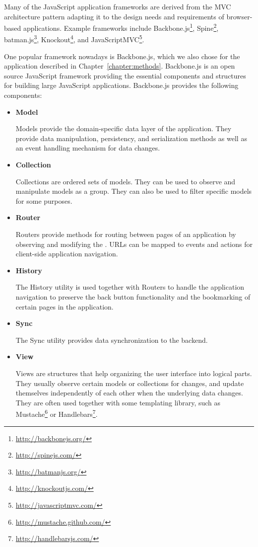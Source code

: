 Many of the JavaScript application frameworks are derived from the MVC
architecture pattern adapting it to the design needs and requirements
of browser-based applications. Example frameworks include
Backbone.js\footnote{\url{http://backbonejs.org/}},
Spine\footnote{\url{http://spinejs.com/}},
batman.js\footnote{\url{http://batmanjs.org/}},
Knockout\footnote{\url{http://knockoutjs.com/}}, and
JavaScriptMVC\footnote{\url{http://javascriptmvc.com/}}.

One popular framework nowadays is Backbone.js, which we also chose for
the application described in
Chapter~\ref{chapter:methods}. Backbone.js is an open source
JavaScript framework providing the essential components and structures
for building large JavaScript applications. Backbone.js provides the
following components:

\begin{itemize}
\item \textbf{Model}

  Models provide the domain-specific data layer of the
  application. They provide data manipulation, persistency, and
  serialization methods as well as an event handling mechanism for
  data changes.

\item \textbf{Collection}

  Collections are ordered sets of models. They can be used to observe
  and manipulate models as a group. They can also be used to filter
  specific models for some purposes.

\item \textbf{Router}

  Routers provide methods for routing between pages of an application
  by observing and modifying the . URLs can be mapped to
  events and actions for client-side application navigation.

\item \textbf{History}

  The History utility is used together with Routers to handle the
  application navigation to preserve the back button functionality and
  the bookmarking of certain pages in the application.

\item \textbf{Sync}

  The Sync utility provides data synchronization to the backend.

\item \textbf{View}

  Views are structures that help organizing the user interface into
  logical parts. They usually observe certain models or collections
  for changes, and update themselves independently of each other when
  the underlying data changes. They are often used together with some
  templating library, such as
  Mustache\footnote{\url{http://mustache.github.com/}} or
  Handlebars\footnote{\url{http://handlebarsjs.com/}}.

\end{itemize}

